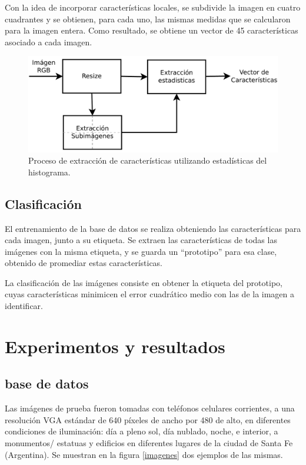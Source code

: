\documentclass[conference,a4paper,10pt,oneside,final]{tfmpd}
\begin{document}
Con la idea de incorporar características locales,
se subdivide la imagen en cuatro 
cuadrantes y se obtienen, para cada uno, las mismas medidas que se calcularon
para  la imagen entera. Como resultado, se obtiene un vector de 45
características asociado a cada imagen.

\begin{figure}
\begin{center}
\includegraphics[scale=0.25]{../diagramas/procesoestadisticas} 
\end{center}
\caption{Proceso de extracción de características utilizando estadísticas del
histograma.}
\label{procesoestadisticas}
\end{figure}

\subsection{Clasificación}
El entrenamiento de la base de datos se realiza obteniendo las características
para cada imagen, junto a su etiqueta.
Se extraen las características de todas las imágenes 
con la misma etiqueta, y se guarda un
``prototipo'' para esa clase, obtenido de promediar estas características.

La clasificación de las imágenes consiste en
obtener la etiqueta del prototipo, cuyas características 
minimicen el error cuadrático medio con las de
la imagen a identificar.
%
%
%
%
\section{Experimentos y resultados}
%
%
\subsection{ base de datos}
Las imágenes de prueba fueron tomadas con teléfonos celulares corrientes, a una
resolución VGA estándar de 640 píxeles de ancho por 480 de alto, en
diferentes condiciones
de iluminación: día a pleno sol, día nublado, noche, e interior, a monumentos/%
estatuas y edificios en diferentes lugares de la ciudad de Santa Fe (Argentina).
Se muestran en la figura \ref{imagenes} dos ejemplos de las mismas.
\end{document}
